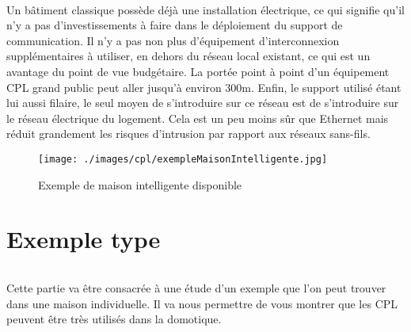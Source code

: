     \paragraph{}
Un bâtiment classique possède déjà une installation électrique,
ce qui signifie qu'il n'y a pas d’investissements à faire dans le déploiement du support de communication.
Il n’y a pas non plus d’équipement d’interconnexion supplémentaires à utiliser,
en dehors du réseau local existant, ce qui est un avantage du point de vue budgétaire.
La portée point à point d’un équipement CPL grand public peut aller jusqu’à environ 300m.
Enfin, le support utilisé étant lui aussi filaire, le seul moyen de s’introduire sur ce réseau est de s'introduire sur le réseau électrique du logement.
Cela est un peu moins sûr que Ethernet mais réduit grandement les risques d’intrusion par rapport aux réseaux sans-fils.

        \begin{figure}[h]
            \begin{center}
                \texttt{[image: ./images/cpl/exempleMaisonIntelligente.jpg]}
            \end{center}
                \caption{ Exemple de maison intelligente disponible } %
                \label{Exemple de maison intelligente disponible}
        \end{figure}


    \clearpage
\part{Exemple type}
            \paragraph{}
Cette partie va être consacrée à une étude d’un exemple que l’on peut trouver dans une maison individuelle.
Il va nous permettre de vous montrer que les CPL peuvent être très utilisés dans la domotique.
